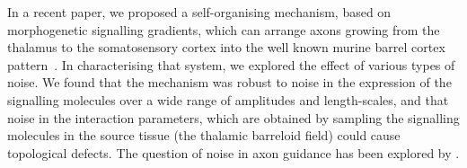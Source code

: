 \documentclass[11pt, a4paper, draft]{article}
\begin{document}


In a recent paper, we proposed a self-organising mechanism, based on
morphogenetic signalling gradients, which can arrange
axons growing from the thalamus to the somatosensory cortex into the well
known murine barrel cortex pattern~\citep{james_modelling_2020}. In
characterising that system, we explored the effect of various types of
noise. We found that the mechanism was robust to noise in the expression of
the signalling molecules over a wide range of amplitudes and length-scales,
and that noise in the interaction parameters, which are obtained by sampling
the signalling molecules in the source tissue (the thalamic barreloid field)
could cause topological defects. The question of noise in axon guidance has
been explored by \citet{goodhill_can_2016}.



\end{document}
